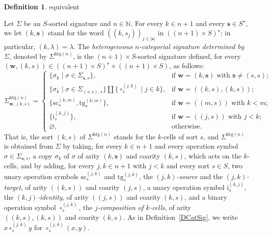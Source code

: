 \documentclass[a4paper, reqno]{amsbook}
\makeatletter
\newcommand{\htg}{\mathrm{htg}}                %
\newcommand{\src}{\mathrm{sc}}
\newcommand{\tgt}{\mathrm{tg}}
\theoremstyle{plain}
\theoremstyle{definition}
\newtheorem{definition}[theorem]{Definition}
\newcommand*{\CA@leanpending}{}
\newcommand*{\CA@leanrelation}{}
\newcommand*{\lean}[2]{%
  \ifcsname\string\color@lean@#1\endcsname\else
    \PackageError{main}{Unknown relation `#1' in \string\lean}{Use equivalent, weaker or stronger.}%
  \fi
  \gdef\CA@leanrelation{#1}%
  \gdef\CA@leanpending{#2}}
\makeatother
\begin{document}
\begin{definition}\label{DCatSigHtg}\lean{equivalent}{Heterogeneous.epSignature,Heterogeneous.hepSignature}
Let $\Sigma$ be an $S$-sorted signature and $n\in\mathbb{N}$.
For every $k\in n+1$ and every $\mathbf{s}\in S^{\star}$, we let $(k,\mathbf{s})$ stand for the word $((k,s_{j}))_{j\in\lvert\mathbf{s}\rvert}$ in $((n+1)\times S)^{\star}$; in particular, $(k,\lambda)=\lambda$.
The \emph{heterogeneous $n$-categorial signature determined by $\Sigma$}, denoted by $\Sigma^{\htg(n)}$, is the $(n+1)\times S$-sorted signature defined, for every $(\mathbf{w},(k,s))\in((n+1)\times S)^{\star}\times((n+1)\times S)$, as follows:
$$
{\Sigma}^{\htg(n)}_{\mathbf{w},(k,s)}=
\begin{cases}
\{\sigma_{k}\mid\sigma\in{\Sigma}_{\mathbf{s},s}\},
& \text{if $\mathbf{w}=(k,\mathbf{s})$ with $\mathbf{s}\neq(s,s)$;}\\
\{\sigma_{k}\mid\sigma\in{\Sigma}_{(s,s),s}\}\amalg\{\circ^{(j,k)}_{s}\mid j\in k\},
& \text{if $\mathbf{w}=((k,s),(k,s))$;}\\
\{\src^{(k,m)}_{s}, \tgt^{(k,m)}_{s}\},
& \text{if $\mathbf{w}=((m,s))$ with $k<m$;}\\
\{\mathrm{i}^{(k,j)}_{s}\},
& \text{if $\mathbf{w}=((j,s))$ with $j<k$;}\\
\varnothing,
& \text{otherwise.}
\end{cases}
$$
That is, the sort $(k,s)$ of ${\Sigma}^{\htg(n)}$ stands for the $k$-cells of sort $s$, and ${\Sigma}^{\htg(n)}$ is obtained from $\Sigma$ by taking, for every $k\in n+1$ and every operation symbol $\sigma\in\Sigma_{\mathbf{s},s}$, a copy $\sigma_{k}$ of $\sigma$ of arity $(k,\mathbf{s})$ and coarity $(k,s)$, which acts on the $k$-cells, and by adding, for every $j,k\in n+1$ with $j<k$ and every sort $s\in S$, two unary operation symbols $\src^{(j,k)}_{s}$ and $\tgt^{(j,k)}_{s}$, the \emph{$(j,k)$-source} and the \emph{$(j,k)$-target}, of arity $((k,s))$ and coarity $(j,s)$, a unary operation symbol $\mathrm{i}^{(k,j)}_{s}$, the \emph{$(k,j)$-identity}, of arity $((j,s))$ and coarity $(k,s)$, and a binary operation symbol $\circ^{(j,k)}_{s}$, the \emph{$j$-composition of $k$-cells}, of arity $((k,s),(k,s))$ and coarity $(k,s)$.
As in Definition~\ref{DCatSig}, we write $x\circ^{(j,k)}_{s}y$ for $\circ^{(j,k)}_{s}(x,y)$.


\end{definition}
\end{document}
